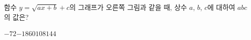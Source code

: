\hspace*{2mm}\begin{minipage}[t]{\dimexpr\linewidth-2mm\relax}\vspace{0pt}
\noindent\begin{minipage}[t]{0.58\linewidth}\vspace{0pt}\raggedright 함수 $y=\sqrt{ax+b}+c$의 그래프가 오른쪽 그림과 같을 때, 상수 $a$, $b$, $c$에 대하여 $abc$의 값은?\end{minipage}\hfill\begin{minipage}[t]{0.4\linewidth}\vspace{0pt}\centering \resizebox{\ifdim\width>\linewidth\linewidth\else\width\fi}{!}{}\end{minipage}\par
\begin{choicesii}{$-72$}{$-18$}{$60$}{$108$}{$144$}\end{choicesii}\end{minipage}
